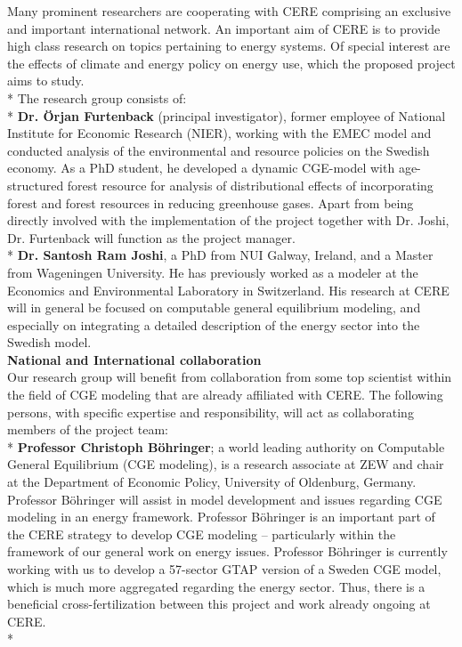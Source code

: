 Many prominent researchers are cooperating with CERE comprising an exclusive and important international network. An important aim of CERE is to provide high class research on topics pertaining to energy systems. Of special interest are the effects of climate and energy policy on energy use, which the proposed project aims to study.\\*
The research group consists of:\\*
\textbf{Dr. Örjan Furtenback} (principal investigator), former employee of National Institute for Economic Research (NIER), working with the EMEC model and conducted analysis of the environmental and resource policies on the Swedish economy. As a PhD student, he developed a dynamic CGE-model with age-structured forest resource for analysis of distributional effects of incorporating forest and forest resources in reducing greenhouse gases. Apart from being directly involved with the implementation of the project together with Dr. Joshi, Dr. Furtenback will function as the project manager.\\*
\textbf{Dr. Santosh Ram Joshi}, a PhD from NUI Galway, Ireland, and a Master from Wageningen University. He has previously worked as a modeler at the Economics and Environmental Laboratory in Switzerland. His research at CERE will in general be focused on computable general equilibrium modeling, and especially on integrating a detailed description of the energy sector into the Swedish model.\\
\textbf{National and International collaboration}\\
Our research group will benefit from collaboration from some top scientist within the field of CGE modeling that are already affiliated with CERE. The following persons, with specific expertise and responsibility, will act as collaborating members of the project team:\\*
\textbf{Professor Christoph Böhringer}; a world leading authority on Computable General Equilibrium (CGE modeling), is a research associate at ZEW and chair at the Department of Economic Policy, University of Oldenburg, Germany. Professor Böhringer will assist in model development and issues regarding CGE modeling in an energy framework. Professor Böhringer is an important part of the CERE strategy to develop CGE modeling – particularly within the framework of our general work on energy issues. Professor Böhringer is currently working with us to develop a 57-sector GTAP version of a Sweden CGE model, which is much more aggregated regarding the energy sector. Thus, there is a beneficial cross-fertilization between this project and work already ongoing at CERE.\\*
